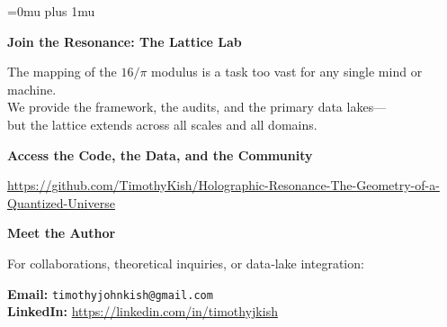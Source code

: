 \documentclass[11pt, letterpaper, openany]{book}
\begin{document}

\clearpage
\thispagestyle{empty}

\begingroup
\Urlmuskip=0mu plus 1mu\relax

\vspace*{2cm}

\begin{center}

{\Huge \textbf{Join the Resonance: The Lattice Lab}}\


{\large
The mapping of the $16/\pi$ modulus is a task too vast for any single mind or machine.\\
We provide the framework, the audits, and the primary data lakes—\\
but the lattice extends across all scales and all domains.
}\


{\Large \textbf{Access the Code, the Data, and the Community}}\


{\large
\url{https://github.com/TimothyKish/Holographic-Resonance-The-Geometry-of-a-Quantized-Universe}
}\


{\Large \textbf{Meet the Author}}\


{\large
For collaborations, theoretical inquiries, or data‑lake integration:\

\textbf{Email:} \texttt{timothyjohnkish@gmail.com}\\
\textbf{LinkedIn:} \url{https://linkedin.com/in/timothyjkish}
}

\end{center}

\endgroup

\clearpage
\end{document}
